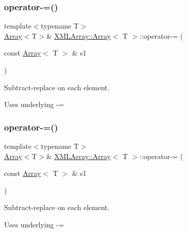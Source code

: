 \subsubsection{\texorpdfstring{operator-\/=()}{operator-=()}\hspace{0.1cm}{\footnotesize\ttfamily [2/6]}}
{\footnotesize\ttfamily template$<$typename T$>$ \\
\mbox{\hyperlink{classXMLArray_1_1Array}{Array}}$<$T$>$\& \mbox{\hyperlink{classXMLArray_1_1Array}{X\+M\+L\+Array\+::\+Array}}$<$ T $>$\+::operator-\/= (\begin{DoxyParamCaption}\item[{const \mbox{\hyperlink{classXMLArray_1_1Array}{Array}}$<$ T $>$ \&}]{s1 }\end{DoxyParamCaption})\hspace{0.3cm}{\ttfamily [inline]}}



Subtract-\/replace on each element. 

Uses underlying -\/= \mbox{\label{classXMLArray_1_1Array_aa92c6d59ed6a656c3004db85bd67c192}} 
\subsubsection{\texorpdfstring{operator-\/=()}{operator-=()}\hspace{0.1cm}{\footnotesize\ttfamily [3/6]}}
{\footnotesize\ttfamily template$<$typename T$>$ \\
\mbox{\hyperlink{classXMLArray_1_1Array}{Array}}$<$T$>$\& \mbox{\hyperlink{classXMLArray_1_1Array}{X\+M\+L\+Array\+::\+Array}}$<$ T $>$\+::operator-\/= (\begin{DoxyParamCaption}\item[{const \mbox{\hyperlink{classXMLArray_1_1Array}{Array}}$<$ T $>$ \&}]{s1 }\end{DoxyParamCaption})\hspace{0.3cm}{\ttfamily [inline]}}



Subtract-\/replace on each element. 

Uses underlying -\/= \mbox{\label{classXMLArray_1_1Array_af903951b5031ab6aa7ee8e2682055f91}} 
